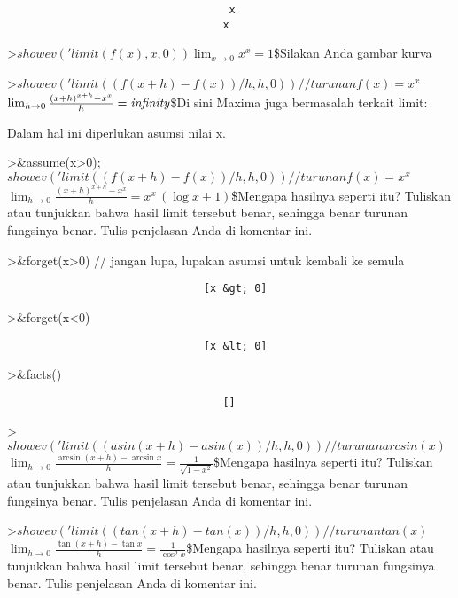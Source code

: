\documentclass[
]{book}
\begin{document}
\begin{verbatim}
                                   x
                                  x
\end{verbatim}

\textgreater{}\(showev('limit(f(x),x,0))\)\(\lim_{x\rightarrow 0}{x^{x}}=1\)\$Silakan Anda gambar kurva

\textgreater{}\(showev('limit((f(x+h)-f(x))/h,h,0)) // turunan f(x)=x^x\)\(\lim_{h\rightarrow 0}{\frac{\left(x+h\right)^{x+h}-x^{x}}{h}}=  {\it infinity}\)\$Di sini Maxima juga bermasalah terkait limit:

Dalam hal ini diperlukan asumsi nilai x.

\textgreater\&assume(x\textgreater0); \(showev('limit((f(x+h)-f(x))/h,h,0)) // turunan f(x)=x^x\)\(\lim_{h\rightarrow 0}{\frac{\left(x+h\right)^{x+h}-x^{x}}{h}}=x^{x}  \,\left(\log x+1\right)\)\$Mengapa hasilnya seperti itu? Tuliskan atau tunjukkan bahwa hasil limit tersebut benar, sehingga benar turunan fungsinya benar. Tulis penjelasan Anda di komentar ini.

\textgreater\&forget(x\textgreater0) // jangan lupa, lupakan asumsi untuk kembali ke semula

\begin{verbatim}
                               [x &gt; 0]
\end{verbatim}

\textgreater\&forget(x\textless0)

\begin{verbatim}
                               [x &lt; 0]
\end{verbatim}

\textgreater\&facts()

\begin{verbatim}
                                  []
\end{verbatim}

\textgreater{}\(showev('limit((asin(x+h)-asin(x))/h,h,0)) // turunan arcsin(x)\)\(\lim_{h\rightarrow 0}{\frac{\arcsin \left(x+h\right)-\arcsin x}{h}}=  \frac{1}{\sqrt{1-x^2}}\)\$Mengapa hasilnya seperti itu? Tuliskan atau tunjukkan bahwa hasil limit tersebut benar, sehingga benar turunan fungsinya benar. Tulis penjelasan Anda di komentar ini.

\textgreater{}\(showev('limit((tan(x+h)-tan(x))/h,h,0)) // turunan tan(x)\)\(\lim_{h\rightarrow 0}{\frac{\tan \left(x+h\right)-\tan x}{h}}=  \frac{1}{\cos ^2x}\)\$Mengapa hasilnya seperti itu? Tuliskan atau tunjukkan bahwa hasil limit tersebut benar, sehingga benar turunan fungsinya benar. Tulis penjelasan Anda di komentar ini.
\end{document}
